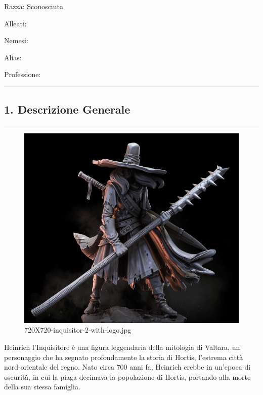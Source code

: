Razza: Sconosciuta

Alleati:

Nemesi:

Alias:

Professione:

\begin{center}\rule{0.5\linewidth}{0.5pt}\end{center}

\subsection{1. Descrizione Generale}\label{descrizione-generale}

\begin{center}\rule{0.5\linewidth}{0.5pt}\end{center}

\begin{figure}
\centering
\includegraphics{720X720-inquisitor-2-with-logo.jpg}
\caption{720X720-inquisitor-2-with-logo.jpg}
\end{figure}

Heinrich l'Inquisitore è una figura leggendaria della mitologia di
Valtara, un personaggio che ha segnato profondamente la storia di
Hortis, l'estrema città nord-orientale del regno. Nato circa 700 anni
fa, Heinrich crebbe in un'epoca di oscurità, in cui la piaga decimava la
popolazione di Hortis, portando alla morte della sua stessa famiglia.

